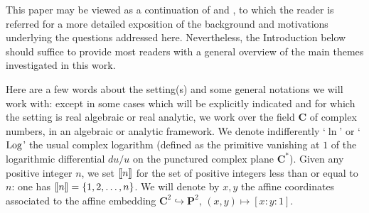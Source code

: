 \documentclass[11pt]{amsart}
\newcommand{\sk}{\smallskip}
\newcommand{\bk}{\bigskip}
\begin{document}
\setcounter{secnumdepth}{3}
\setcounter{tocdepth}{1}
\tableofcontents

\vspace{-0.5cm}


\newpage



This paper may be viewed as a continuation of \cite{CP} and \cite{PirioAFST},
to which the reader is referred for a more detailed exposition of the background and motivations underlying the questions addressed here. Nevertheless, the Introduction below should suffice to provide most readers with a general overview of the main themes investigated in this work.  \sk 
 
 
  
 Here are a few words about the setting(s) and some general notations we will work with:  
  except in some cases which will be explicitly indicated and for which the setting is real algebraic or real analytic, we work over the field $\mathbf C$ of complex numbers, in 
  an algebraic or analytic framework. 
 We denote indifferently `$\ln$' or `${\rm Log}$' the usual complex logarithm (defined as the primitive vanishing at $1$ of the logarithmic differential $du/u$ on 
 the punctured complex plane $\mathbf C^*$). Given any positive integer $n$, we set  
 $[\hspace{-0.05cm}[ n ]\hspace{-0.05cm}]$ for the set of positive integers less than or equal to $n$: 
 one has  $[\hspace{-0.05cm}[ n ]\hspace{-0.05cm}]=\{1,2,\ldots,n\}$. 
 We will denote by $x,y$  the affine coordinates associated to the affine embedding 
$\mathbf C^2\hookrightarrow \mathbf P^2,\, (x,y)\mapsto [x:y:1]$.

 
 
 


 
 
 
 
 

\end{document}
